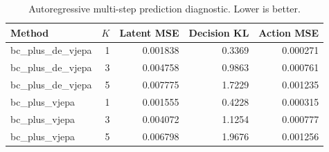 \begin{table}[t]
\centering
\caption{Autoregressive multi-step prediction diagnostic. Lower is better.}
\label{tab:multistep-diagnostic}
\begin{tabular}{lrrrr}
\toprule
\textbf{Method} & \textbf{$K$} & \textbf{Latent MSE} & \textbf{Decision KL} & \textbf{Action MSE} \\
\midrule
bc\_plus\_de\_vjepa & 1 & 0.001838 & 0.3369 & 0.000271 \\
bc\_plus\_de\_vjepa & 3 & 0.004758 & 0.9863 & 0.000761 \\
bc\_plus\_de\_vjepa & 5 & 0.007775 & 1.7229 & 0.001235 \\
bc\_plus\_vjepa & 1 & 0.001555 & 0.4228 & 0.000315 \\
bc\_plus\_vjepa & 3 & 0.004072 & 1.1254 & 0.000777 \\
bc\_plus\_vjepa & 5 & 0.006798 & 1.9676 & 0.001256 \\
\bottomrule
\end{tabular}
\end{table}
